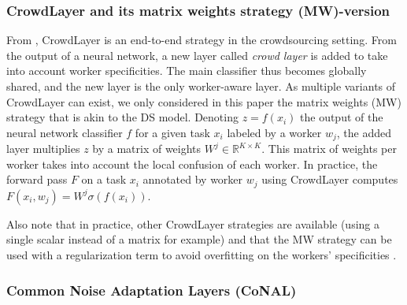 \subsubsection{CrowdLayer and its matrix weights strategy (MW)-version}
\label{subsec:crowdlayer}

From \citep{rodrigues2018deep}, CrowdLayer is an end-to-end strategy in the crowdsourcing setting.
From the output of a neural network, a new layer called \emph{crowd layer} is added to take into account worker specificities.
The main classifier thus becomes globally shared, and the new layer is the only worker-aware layer.
As multiple variants of CrowdLayer can exist, we only considered in this paper the matrix weights (MW) strategy that is akin to the DS model.
Denoting $z=f(x_i)$ the output of the neural network classifier $f$ for a given task $x_i$ labeled by a worker $w_j$, the added layer multiplies $z$ by a matrix of weights $W^j \in\mathbb{R}^{K\times K}$.
This matrix of weights per worker takes into account the local confusion of each worker.
In practice, the forward pass $F$ on a task $x_i$ annotated by worker $w_j$ using CrowdLayer computes $F(x_i, w_j) = W^j\sigma(f(x_i))$.

Also note that in practice, other CrowdLayer strategies are available (using a single scalar instead of a matrix for example) and that the MW strategy can be used with a regularization term to avoid overfitting on the workers' specificities \citep{tanoreg}.

\subsubsection{Common Noise Adaptation Layers (CoNAL)}
\label{subsec:conal}

